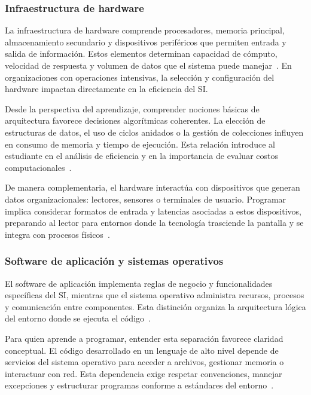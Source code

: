 \documentclass[12pt,twoside]{book}
\begin{document}
					\subsubsection{Infraestructura de hardware}
						\noindent
						La infraestructura de hardware comprende procesadores, memoria principal, almacenamiento secundario y dispositivos periféricos que permiten entrada y salida de información. Estos elementos determinan capacidad de cómputo, velocidad de respuesta y volumen de datos que el sistema puede manejar~\cite{Tanenbaum2021Structured,Laudon2020Management}. En organizaciones con operaciones intensivas, la selección y configuración del hardware impactan directamente en la eficiencia del SI.
						
						Desde la perspectiva del aprendizaje, comprender nociones básicas de arquitectura favorece decisiones algorítmicas coherentes. La elección de estructuras de datos, el uso de ciclos anidados o la gestión de colecciones influyen en consumo de memoria y tiempo de ejecución. Esta relación introduce al estudiante en el análisis de eficiencia y en la importancia de evaluar costos computacionales~\cite{Wirth1976Algorithms,Hanly2015Problem,Gaddis2022Starting}.
						
						De manera complementaria, el hardware interactúa con dispositivos que generan datos organizacionales: lectores, sensores o terminales de usuario. Programar implica considerar formatos de entrada y latencias asociadas a estos dispositivos, preparando al lector para entornos donde la tecnología trasciende la pantalla y se integra con procesos físicos~\cite{Laudon2020Management,Tanenbaum2021Structured,Kendall2014Systems}.
						
					\subsubsection{Software de aplicación y sistemas operativos}
						\noindent
						El software de aplicación implementa reglas de negocio y funcionalidades específicas del SI, mientras que el sistema operativo administra recursos, procesos y comunicación entre componentes. Esta distinción organiza la arquitectura lógica del entorno donde se ejecuta el código~\cite{Silberschatz2018Operating,Sommerville2015Software,Laudon2020Management}.
						
						Para quien aprende a programar, entender esta separación favorece claridad conceptual. El código desarrollado en un lenguaje de alto nivel depende de servicios del sistema operativo para acceder a archivos, gestionar memoria o interactuar con red. Esta dependencia exige respetar convenciones, manejar excepciones y estructurar programas conforme a estándares del entorno~\cite{Gaddis2022Starting,Hanly2015Problem,Silberschatz2018Operating}.
						
\end{document}
